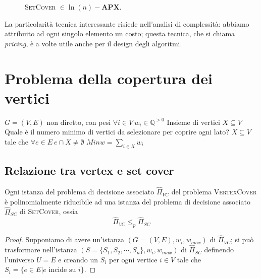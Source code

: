 \begin{figure}[h]
	\caption{\textsc{SetCover} $\in \ln(n)-\mathbf{APX}$.}
	\label{fig:setcoverapx}
\end{figure}

La particolarità tecnica interessante risiede nell'analisi di complessità:
abbiamo attribuito ad ogni singolo elemento un costo; questa tecnica, che
si chiama \textit{pricing}, è a volte utile anche per il design degli algoritmi.

\section{Problema della copertura dei vertici}
 {$G = (V,E)$ non diretto, con pesi
	$\forall i \in V ~ w_i \in \mathbb{Q}^{>0}$}
{Insieme di vertici $X \subseteq V$}
{Quale è il numero minimo di vertici da selezionare per coprire ogni lato?}
{$X \subseteq V$ tale che $\forall e \in E ~ e \cap X \neq \emptyset$}
{$Min$}{$w = \sum_{i \in X} w_i$}

\subsection{Relazione tra vertex e set cover}
\begin{theorem}\label{thm:vc_polyred_sc}
	Ogni istanza del problema di decisione associato $\hat{\Pi}_{VC}$ del problema \textsc{VertexCover} è
	polinomialmente riducibile ad una istanza del problema di decisione associato
	$\hat{\Pi}_{SC}$ di \textsc{SetCover}, ossia
	$$
		\hat{\Pi}_{VC} \leq_p \hat{\Pi}_{SC}
	$$
\end{theorem}
\begin{proof}
	Supponiamo di avere un'istanza $(G=(V,E), w_i, w_{max})$ di
	$\hat{\Pi}_{VC}$; si può trasformare nell'istanza
	$(S= \{S_1, S_2, \cdots, S_n\}, w_i, w_{max})$ di $\hat{\Pi}_{SC}$ 
	definendo l'universo $U=E$ e creando un $S_i$ per ogni vertice $i \in V$ tale che 
	$S_i = \{e \in E | e \text{ incide su } i\}$.
\end{proof}

